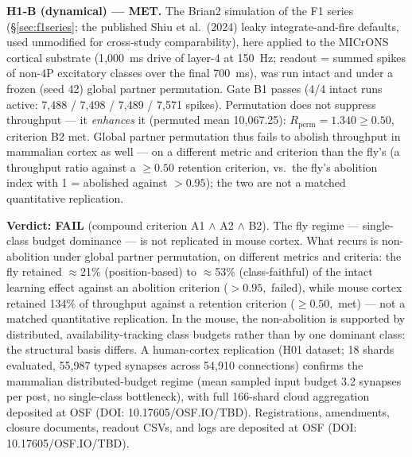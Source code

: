\documentclass[11pt,twocolumn]{article}
\theoremstyle{plain}
\begin{document}
\textbf{H1-B (dynamical) --- MET.} The Brian2 simulation of the F1
series (\S\ref{sec:f1series}; the published Shiu et al.\ (2024) leaky
integrate-and-fire defaults, used unmodified for cross-study
comparability), here applied to the MICrONS cortical substrate
(1{,}000~ms drive of layer-4 at 150~Hz; readout = summed spikes of
non-4P excitatory classes over the final 700~ms), was run intact and
under a frozen (seed 42) global partner permutation. Gate B1 passes (4/4
intact runs active: 7{,}488 / 7{,}498 / 7{,}489 / 7{,}571 spikes).
Permutation does not suppress throughput --- it \emph{enhances} it
(permuted mean 10{,}067.25): $R_{\mathrm{perm}} = 1.340 \geq 0.50$,
criterion B2 met. Global partner permutation thus fails to abolish
throughput in mammalian cortex as well --- on a different metric and
criterion than the fly's (a throughput ratio against a $\geq 0.50$
retention criterion, vs.\ the fly's abolition index with 1 = abolished
against $>0.95$); the two are not a matched quantitative replication.

\textbf{Verdict: FAIL} (compound criterion A1 $\wedge$ A2 $\wedge$ B2).
The fly regime --- single-class budget dominance --- is not replicated in
mouse cortex. What recurs is non-abolition under global partner
permutation, on different metrics and criteria: the fly retained
$\approx$21\% (position-based) to $\approx$53\% (class-faithful) of the
intact learning effect against an abolition criterion ($>0.95,$ failed),
while mouse cortex retained 134\% of throughput against a retention
criterion ($\geq 0.50,$ met) --- not a matched quantitative replication.
In the mouse, the non-abolition is supported by distributed,
availability-tracking class budgets rather than by one dominant class:
the structural basis differs. A human-cortex replication (H01 dataset;
18 shards evaluated, 55,987 typed synapses across 54,910 connections)
confirms the mammalian distributed-budget regime (mean sampled input
budget 3.2 synapses per post, no single-class bottleneck), with full
166-shard cloud aggregation deposited at OSF (DOI: 10.17605/OSF.IO/TBD).
Registrations, amendments, closure documents, readout CSVs, and
logs are deposited at OSF (DOI: 10.17605/OSF.IO/TBD).
\end{document}
